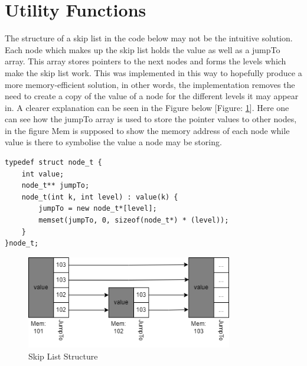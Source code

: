 \documentclass[12pt, a4paper]{report}
\begin{document}
\section{Utility Functions}
The structure of a skip list in the code below may not be the intuitive solution. Each node which makes up the skip list holds the value as well as a jumpTo array. This array stores pointers to the next nodes and forms the levels which make the skip list work. This was implemented in this way to hopefully produce a more memory-efficient solution, in other words, the implementation removes the need to create a copy of the value of a node for the different levels it may appear in. A clearer explanation can be seen in the Figure below [Figure: \ref{skip_list}]. Here one can see how the jumpTo array is used to store the pointer values to other nodes, in the figure Mem is supposed to show the memory address of each node while value is there to symbolise the value a node may be storing.
\begin{verbatim}
typedef struct node_t {
    int value;
    node_t** jumpTo;
    node_t(int k, int level) : value(k) {
        jumpTo = new node_t*[level];
        memset(jumpTo, 0, sizeof(node_t*) * (level));
    }
}node_t;
\end{verbatim}

\begin{figure}[!htp]
    \centering
    \includegraphics[width=9cm]{SkipList.drawio.png}
    \caption{Skip List Structure}
    \label{skip_list}
\end{figure}
\end{document}
